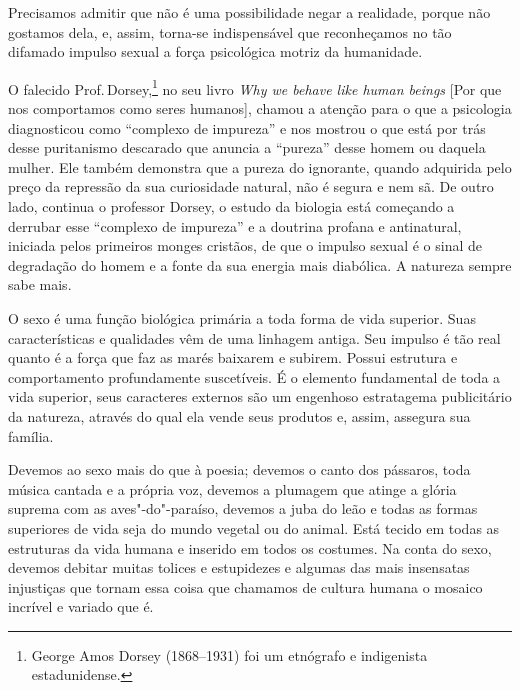 Precisamos admitir que não é uma possibilidade negar a realidade, porque não gostamos dela, e, assim, torna-se indispensável que
reconheçamos no tão difamado impulso sexual a força psicológica motriz
da humanidade.

\asterisc

O falecido Prof.\,Dorsey,\footnote{George Amos Dorsey (1868--1931) foi um etnógrafo e indigenista estadunidense.} no seu livro \textit{Why we behave like human beings} {[}Por que nos comportamos como seres humanos{]}, chamou a atenção para o que a psicologia diagnosticou
como ``complexo de impureza'' e nos mostrou o que está por trás desse
puritanismo descarado que anuncia a ``pureza'' desse homem ou daquela mulher. Ele
também demonstra que a pureza do ignorante, quando adquirida pelo preço
da repressão da sua curiosidade natural, não é segura e nem sã. De outro
lado, continua o professor Dorsey, o estudo da biologia está começando a
derrubar esse ``complexo de impureza'' e a doutrina profana e
antinatural, iniciada pelos primeiros monges cristãos, de que o impulso
sexual é o sinal de degradação do homem e a fonte da sua energia mais
diabólica. A natureza sempre sabe mais.

O sexo é uma função biológica primária a toda forma de vida superior.
Suas características e qualidades vêm de uma linhagem antiga. Seu
impulso é tão real quanto é a força que faz as marés baixarem e
subirem. Possui estrutura e comportamento profundamente suscetíveis. É o
elemento fundamental de toda a vida superior, seus caracteres externos
são um engenhoso estratagema publicitário da natureza, através do qual
ela vende seus produtos e, assim, assegura sua família.

Devemos ao sexo mais do que à poesia; devemos o canto dos pássaros, toda
música cantada e a própria voz, devemos a plumagem que atinge a glória
suprema com as aves"-do"-paraíso, devemos a juba do leão e todas as formas
superiores de vida seja do mundo vegetal ou do animal. Está tecido em
todas as estruturas da vida humana e inserido em todos os costumes. Na
conta do sexo, devemos debitar muitas tolices e estupidezes e algumas
das mais insensatas injustiças que tornam essa coisa que chamamos de
cultura humana o mosaico incrível e variado que é.

